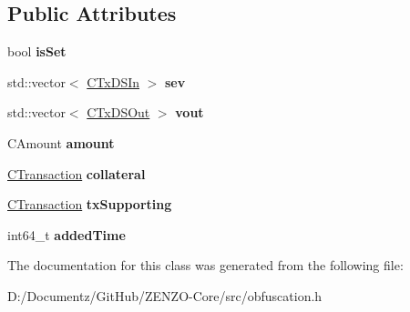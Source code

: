 \subsection*{Public Attributes}
\begin{DoxyCompactItemize}
\item 
\mbox{\label{class_c_obfu_scation_entry_adf4dca5a54563871690ce0ac45fd0abe}} 
bool {\bfseries is\+Set}
\item 
\mbox{\label{class_c_obfu_scation_entry_a20d9590c3fe30ac6a9220967df9842df}} 
std\+::vector$<$ \mbox{\hyperlink{class_c_tx_d_s_in}{C\+Tx\+D\+S\+In}} $>$ {\bfseries sev}
\item 
\mbox{\label{class_c_obfu_scation_entry_a06dc8d953ac6c37d68e408d1451fbef1}} 
std\+::vector$<$ \mbox{\hyperlink{class_c_tx_d_s_out}{C\+Tx\+D\+S\+Out}} $>$ {\bfseries vout}
\item 
\mbox{\label{class_c_obfu_scation_entry_a9f2dd71f610c45855b4774976cadb4fc}} 
C\+Amount {\bfseries amount}
\item 
\mbox{\label{class_c_obfu_scation_entry_a418397fa2597c146f1a535ee0d5bb1c2}} 
\mbox{\hyperlink{class_c_transaction}{C\+Transaction}} {\bfseries collateral}
\item 
\mbox{\label{class_c_obfu_scation_entry_ae20f79dfe6488796932654a35627e0fb}} 
\mbox{\hyperlink{class_c_transaction}{C\+Transaction}} {\bfseries tx\+Supporting}
\item 
\mbox{\label{class_c_obfu_scation_entry_a1eb6adfe7e36c542f14c8cc654aa7f75}} 
int64\+\_\+t {\bfseries added\+Time}
\end{DoxyCompactItemize}


The documentation for this class was generated from the following file\+:\begin{DoxyCompactItemize}
\item 
D\+:/\+Documentz/\+Git\+Hub/\+Z\+E\+N\+Z\+O-\/\+Core/src/obfuscation.\+h\end{DoxyCompactItemize}
